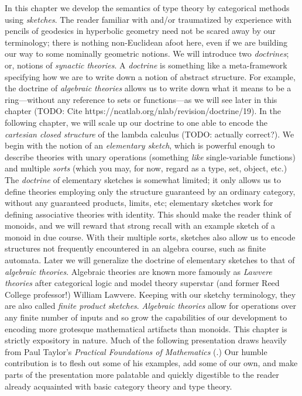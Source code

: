 \documentclass[12pt,twoside]{reedthesis}
\theoremstyle{definition}
\theoremstyle{remark}
\theoremstyle{plain}
\begin{document}
In this chapter we develop the semantics of type theory by categorical methods
using \emph{sketches}. The reader familiar with and/or traumatized by experience
with pencils of geodesics in hyperbolic geometry need not be scared away by our
terminology; there is nothing non-Euclidean afoot here, even if we are building
our way to some nominally geometric notions. We will introduce two
\emph{doctrines}; or, notions of \emph{synactic theories}. A \emph{doctrine} is
something like a meta-framework specifying how we are to write down a notion of
abstract structure. For example, the doctrine of \emph{algebraic theories}
allows us to write down what it means to be a ring---without any reference to sets
or functions---as we will see later in this chapter (TODO: Cite
https://ncatlab.org/nlab/revision/doctrine/19). In the following chapter, we
will scale up our doctrine to one able to encode the \emph{cartesian closed
  structure} of the lambda calculus (TODO: actually correct?). We begin with the
notion of an \emph{elementary sketch}, which is powerful enough to describe
theories with unary operations (something \emph{like} single-variable functions)
and multiple \emph{sorts} (which you may, for now, regard as a type, set,
object, etc.) The \emph{doctrine} of elementary sketches is somewhat limited; it
only allows us to define theories employing only the structure guaranteed by an
ordinary category, without any guaranteed products, limits, etc; elementary
sketches work for defining associative theories with identity. This should make
the reader think of monoids, and we will reward that strong recall with an
example sketch of a monoid in due course. With their multiple sorts, sketches
also allow us to encode structures not frequently encountered in an algebra
course, such as finite automata. Later we will generalize the doctrine of
elementary sketches to that of \emph{algebraic theories}. Algebraic theories are
known more famously as \emph{Lawvere theories} after categorical logic and model
theory superstar (and former Reed College professor!) William Lawvere. Keeping
with our sketchy terminology, they are also called \emph{finite product
  sketches}. \emph{Algebraic theories} allow for operations over any finite
number of inputs and so grow the capabilities of our development to encoding
more grotesque mathematical artifacts than monoids. This chapter is strictly
expository in nature. Much of the following presentation draws heavily from Paul
Taylor's \emph{Practical Foundations of Mathematics}
(\cite{taylor_practical_1999}.) Our humble contribution is to flesh out some of
his examples, add some of our own, and make parts of the presentation more
palatable and quickly digestible to the reader already acquainted with basic
category theory and type theory.
\end{document}

